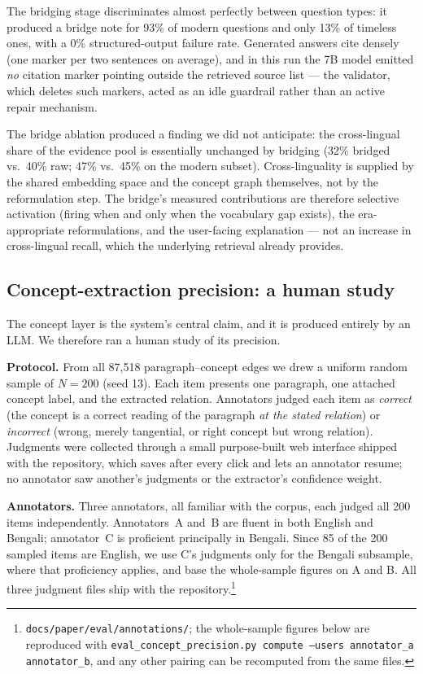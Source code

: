 \documentclass[pdflatex,sn-mathphys-num]{sn-jnl}
\begin{document}
The bridging stage discriminates almost perfectly between question types:
it produced a bridge note for 93\% of modern questions and only 13\% of
timeless ones, with a 0\% structured-output failure rate. Generated
answers cite densely (one marker per two sentences on average), and in
this run the 7B model emitted \emph{no} citation marker pointing outside
the retrieved source list --- the validator, which deletes such markers,
acted as an idle guardrail rather than an active repair mechanism.

The bridge ablation produced a finding we did not anticipate: the
cross-lingual share of the evidence pool is essentially unchanged by
bridging (32\% bridged vs.\ 40\% raw; 47\% vs.\ 45\% on the modern
subset). Cross-linguality is supplied by the shared embedding space and
the concept graph themselves, not by the reformulation step. The bridge's
measured contributions are therefore selective activation (firing when
and only when the vocabulary gap exists), the era-appropriate
reformulations, and the user-facing explanation --- not an increase in
cross-lingual recall, which the underlying retrieval already provides.

\subsection{Concept-extraction precision: a human study}
\label{sec:eval-precision}

The concept layer is the system's central claim, and it is produced
entirely by an LLM. We therefore ran a human study of its precision.

\textbf{Protocol.} From all 87{,}518 paragraph--concept edges we drew a
uniform random sample of $N=200$ (seed 13). Each item presents one
paragraph, one attached concept label, and the extracted relation.
Annotators judged each item as \emph{correct} (the concept is a correct
reading of the paragraph \emph{at the stated relation}) or
\emph{incorrect} (wrong, merely tangential, or right concept but wrong
relation). Judgments were collected through a small purpose-built web
interface shipped with the repository, which saves after every click and
lets an annotator resume; no annotator saw another's judgments or the
extractor's confidence weight.

\textbf{Annotators.} Three annotators, all familiar with the corpus, each
judged all 200 items independently. Annotators~A and~B are fluent in
both English and Bengali; annotator~C is proficient principally in
Bengali. Since 85 of the 200 sampled items are English, we use C's
judgments only for the Bengali subsample, where that proficiency applies,
and base the whole-sample figures on A and B. All three judgment files
ship with the repository.\footnote{\texttt{docs/paper/eval/annotations/};
the whole-sample figures below are reproduced with
\texttt{eval\_concept\_precision.py compute --users annotator\_a annotator\_b}, and any
other pairing can be recomputed from the same files.}
\end{document}
